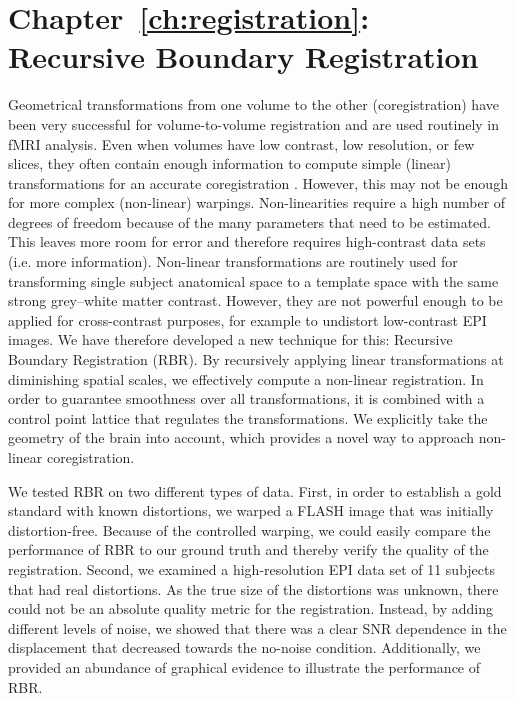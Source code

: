 \section*{Chapter~\ref{ch:registration}: Recursive Boundary Registration}
Geometrical transformations from one volume to the other (coregistration) have been very successful for volume-to-volume registration and are used routinely in fMRI analysis. Even when volumes have low contrast, low resolution, or few slices, they often contain enough information to compute simple (linear) transformations for an accurate coregistration \cite{Greve2012}. However, this may not be enough for more complex (non-linear) warpings. Non-linearities require a high number of degrees of freedom because of the many parameters that need to be estimated. This leaves more room for error and therefore requires high-contrast data sets (i.e. more information). Non-linear transformations are routinely used for transforming single subject anatomical space to a template space with the same strong grey–white matter contrast. However, they are not powerful enough to be applied for cross-contrast purposes, for example to undistort low-contrast EPI images. We have therefore developed a new technique for this: Recursive Boundary Registration (RBR). By recursively applying linear transformations at diminishing spatial scales, we effectively compute a non-linear registration. In order to guarantee smoothness over all transformations, it is combined with a control point lattice that regulates the transformations. We explicitly take the geometry of the brain into account, which provides a novel way to approach non-linear coregistration.

We tested RBR on two different types of data. First, in order to establish a gold standard with known distortions, we warped a FLASH image that was initially distortion-free. Because of the controlled warping, we could easily compare the performance of RBR to our ground truth and thereby verify the quality of the registration. Second, we examined a high-resolution EPI data set of 11 subjects that had real distortions. As the true size of the distortions was unknown, there could not be an absolute quality metric for the registration. Instead, by adding different levels of noise, we showed that there was a clear SNR dependence in the displacement that decreased towards the no-noise condition. Additionally, we provided an abundance of graphical evidence to illustrate the performance of RBR.

